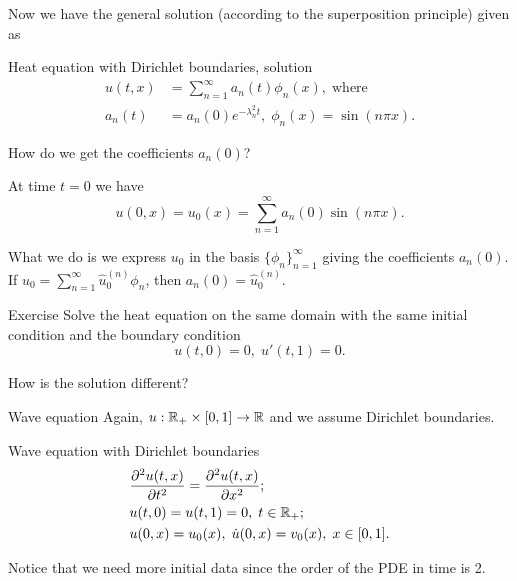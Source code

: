 \begin{frame}
	Now we have the general solution (according to the superposition principle) given as
	\begin{block}{\centering Heat equation with Dirichlet boundaries, solution}
		\begin{align*}
			u(t,x) &= \sum_{n=1}^{\infty} a_n(t) \phi_n(x), \; \text{where} \\
			a_n(t) &= a_n(0) e^{-\lambda_n^2 t}, \; \phi_n(x) = \sin(n \pi x).
		\end{align*}
	\end{block}

	\pause
	How do we get the coefficients $ a_n(0) $?
	
	\pause
	At time $ t=0 $ we have 
	\[ u(0,x) = u_0 (x) = \sum_{n=1}^{\infty} a_n(0) \sin(n \pi x). \]
	
	\pause
	What we do is we express $ u_0  $ in the basis $ \{ \phi_n \}_{n=1}^\infty $ giving the coefficients $ a_n(0) $. If $ u_0 = \sum_{n=1}^{\infty} \hat{u}_0^{(n)} \phi_n $, then $ a_n(0) =\hat{u}_0^{(n)} $.
\end{frame}

\begin{frame}{Exercise \exercisen}
	Solve the heat equation on the same domain with the same initial condition and the boundary condition 
	\[ u(t,0) = 0, \; u'(t,1) = 0. \]
	
	How is the solution different?
\end{frame}

\begin{frame}{Wave equation}
	Again, $ u: \R_{+} \times [0,1] \to \R $ and we assume Dirichlet boundaries.
	
	\pause
	\begin{block}{\centering Wave equation with Dirichlet boundaries}
		\begin{align*}
			&\pfrac[2]{u(t,x)}{t} = \pfrac[2]{u(t,x)}{x}; \\
			&u(t,0) = u(t,1) = 0,\; t \in \R_{+}; \\
			&u(0,x) = u_0(x),\; \dot{u}(0,x) = v_0 (x), \; x \in [0,1].
		\end{align*}
	\end{block}

	Notice that we need more initial data since the order of the PDE in time is 2. 

\end{frame}

